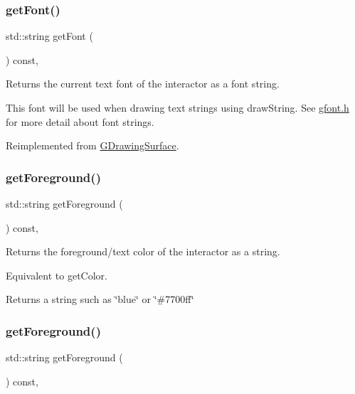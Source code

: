 \subsubsection{\texorpdfstring{get\+Font()}{getFont()}}
{\footnotesize\ttfamily std\+::string get\+Font (\begin{DoxyParamCaption}{ }\end{DoxyParamCaption}) const\hspace{0.3cm}{\ttfamily [override]}, {\ttfamily [virtual]}}



Returns the current text font of the interactor as a font string. 

This font will be used when drawing text strings using draw\+String. See \mbox{\hyperlink{gfont_8h_source}{gfont.\+h}} for more detail about font strings. 

Reimplemented from \mbox{\hyperlink{classGDrawingSurface_a894a5502900794eeb27d084c21f1d77d}{G\+Drawing\+Surface}}.

\mbox{\label{classGInteractor_a4fa2d8b0192a3a5b4af4bbfe71194d03}} 
\subsubsection{\texorpdfstring{get\+Foreground()}{getForeground()}\hspace{0.1cm}{\footnotesize\ttfamily [1/2]}}
{\footnotesize\ttfamily std\+::string get\+Foreground (\begin{DoxyParamCaption}{ }\end{DoxyParamCaption}) const\hspace{0.3cm}{\ttfamily [virtual]}, {\ttfamily [inherited]}}



Returns the foreground/text color of the interactor as a string. 

Equivalent to get\+Color. \begin{DoxyReturn}{Returns}
a string such as \char`\"{}blue\char`\"{} or \char`\"{}\#7700ff\char`\"{} 
\end{DoxyReturn}
\mbox{\label{classGDrawingSurface_a4fa2d8b0192a3a5b4af4bbfe71194d03}} 
\subsubsection{\texorpdfstring{get\+Foreground()}{getForeground()}\hspace{0.1cm}{\footnotesize\ttfamily [2/2]}}
{\footnotesize\ttfamily std\+::string get\+Foreground (\begin{DoxyParamCaption}{ }\end{DoxyParamCaption}) const\hspace{0.3cm}{\ttfamily [virtual]}, {\ttfamily [inherited]}}



